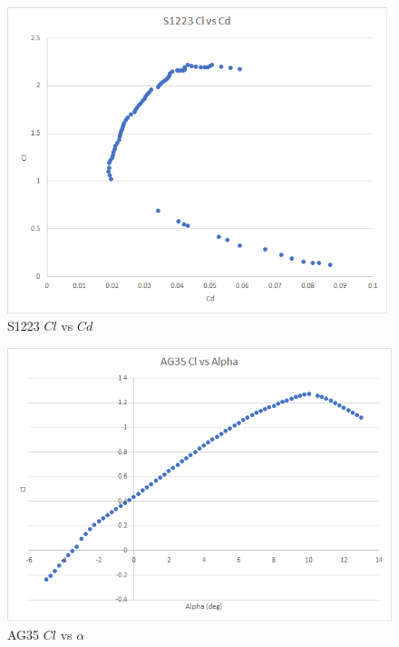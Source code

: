 \documentclass{article}
\begin{document}
\begin{figure}[!h]
\begin{center}
	\includegraphics[scale=1]{s1223clvscd.png}
	\caption{S1223 $Cl$ vs $Cd$}
	\label{Figure 6:}
\end{center}
\end{figure}

\newpage
\begin{figure}[!h]
\begin{center}
	\includegraphics[scale=1]{ag35clvsalpha.png}
	\caption{AG35 $Cl$ vs $\alpha$}
	\label{Figure 7:}
\end{center}
\end{figure}
\end{document}
